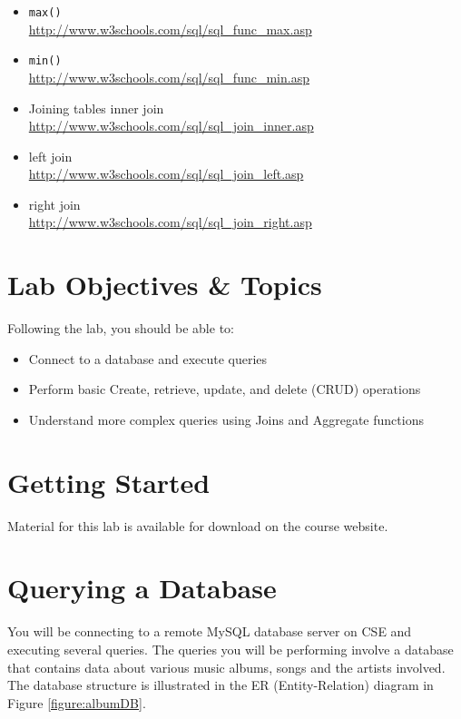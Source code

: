 \documentclass[12pt]{scrartcl}
\begin{document}
\begin{enumerate}
\begin{itemize}
    \item \texttt{max()}	\\ \url{http://www.w3schools.com/sql/sql_func_max.asp}
    \item \texttt{min()}	\\ \url{http://www.w3schools.com/sql/sql_func_min.asp}
    \item Joining tables	inner join	\\ 
    \url{http://www.w3schools.com/sql/sql_join_inner.asp} 
	\item left join	\\ 
    \url{http://www.w3schools.com/sql/sql_join_left.asp} 
	\item right join	\\ 
    \url{http://www.w3schools.com/sql/sql_join_right.asp} 
  \end{itemize}  
\end{enumerate}

\section*{Lab Objectives \& Topics}
Following the lab, you should be able to:
\begin{itemize}
  \item Connect to a database and execute queries
  \item Perform basic Create, retrieve, update, and delete (CRUD) operations
  \item Understand more complex queries using Joins and Aggregate functions
\end{itemize}



\section*{Getting Started}

Material for this lab is available for download on the course website.

\section*{Querying a Database}

You will be connecting to a remote MySQL database server on CSE 
and executing several queries.  The queries you will be performing 
involve a database that contains data about various music albums, songs
and the artists involved.  The database structure is illustrated 
in the ER (Entity-Relation) diagram in Figure \ref{figure:albumDB}.
\end{document}
